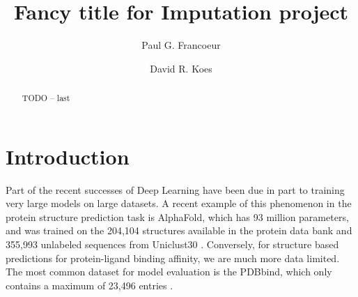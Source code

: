 \documentclass[journal=jmcmar,manuscript=article]{achemso}
\author{Paul G. Francoeur}
\author{David R. Koes}
\affiliation[Pitt]{Department of Computational and Systems Biology, University of Pittsburgh, Pittsburgh, PA 15260}
\title[some shit we did]{Fancy title for Imputation project}
\begin{document}
\begin{tocentry}




\end{tocentry}

\begin{abstract}
TODO -- last

\end{abstract}


\section{Introduction}

Part of the recent successes of Deep Learning have been due in part to training very large models on large datasets.
A recent example of this phenomenon in the protein structure prediction task is AlphaFold, which has 93 million parameters, and was trained on the 204,104 structures available in the protein data bank and 355,993 unlabeled sequences from Uniclust30 \cite{alphafold}.
Conversely, for structure based predictions for protein-ligand binding affinity, we are much more data limited.
The most common dataset for model evaluation is the PDBbind, which only contains a maximum of 23,496 entries \cite{pdbbind2016}.
\end{document}
